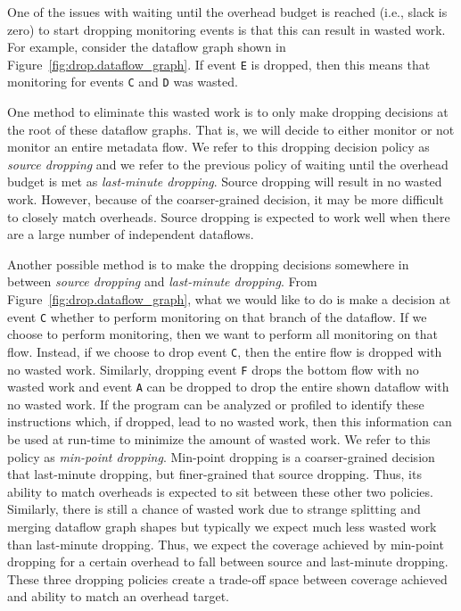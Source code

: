 One of the issues with waiting until the overhead budget is reached (i.e.,
slack is zero) to start dropping monitoring events is that this can result in
wasted work. For example, consider the dataflow graph shown in
Figure~\ref{fig:drop.dataflow_graph}. If event {\tt E} is dropped, then this
means that monitoring for events {\tt C} and {\tt D} was wasted.

One method to eliminate this wasted work is to only make dropping decisions at
the root of these dataflow graphs. That is, we will decide to either monitor or
not monitor an entire metadata flow. We refer to this dropping decision policy
as \emph{source dropping} and we refer to the previous policy of waiting until
the overhead budget is met as \emph{last-minute dropping}. Source dropping will
result in no wasted work. However, because of the coarser-grained decision, it
may be more difficult to closely match overheads. Source dropping is expected
to work well when there are a large number of independent dataflows.

Another possible method is to make the dropping decisions somewhere in between
\emph{source dropping} and \emph{last-minute dropping}. From
Figure~\ref{fig:drop.dataflow_graph}, what we would like to do is make a
decision at event {\tt C} whether to perform monitoring on that branch of the
dataflow. If we choose to perform monitoring, then we want to perform all
monitoring on that flow. Instead, if we choose to drop event {\tt C}, then the
entire flow is dropped with no wasted work. Similarly, dropping event {\tt F}
drops the bottom flow with no wasted work and event {\tt A} can be dropped to
drop the entire shown dataflow with no wasted work. If the program can be
analyzed or profiled to identify these instructions which, if dropped, lead to
no wasted work, then this information can be used at run-time to minimize the
amount of wasted work. We refer to this policy as \emph{min-point dropping}.
Min-point dropping is a coarser-grained decision that last-minute dropping, but
finer-grained that source dropping. Thus, its ability to match overheads is
expected to sit between these other two policies. Similarly, there is still a
chance of wasted work due to strange splitting and merging dataflow graph
shapes but typically we expect much less wasted work than last-minute
dropping. Thus, we expect the coverage achieved by min-point dropping for a
certain overhead to fall between source and last-minute dropping. These three
dropping policies create a trade-off space between coverage achieved and
ability to match an overhead target.

